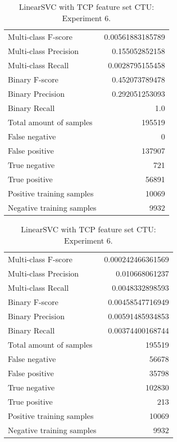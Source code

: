 \begin{table}[H]
\begin{minipage}{0.5\textwidth}
\caption{LinearSVC with TCP feature set CTU: Experiment 5.}
\centering
\begin{tabular}{l r}
\toprule
Multi-class F-score & 0.00561883185789 \\
Multi-class Precision & 0.155052852158 \\
Multi-class Recall & 0.0028795155458 \\
\midrule
Binary F-score & 0.452073789478 \\
Binary Precision & 0.292051253093 \\
Binary Recall & 1.0 \\
\midrule
Total amount of samples & 195519 \\
False negative & 0 \\
False positive & 137907 \\
True negative & 721 \\
True positive & 56891 \\
\midrule
Positive training samples & 10069 \\
Negative training samples & 9932 \\
\bottomrule
\end{tabular}
\end{minipage}
\hfillx
\begin{minipage}{0.5\textwidth}
\caption{LinearSVC with TCP feature set CTU: Experiment 6.}
\centering
\begin{tabular}{l r}
\toprule
Multi-class F-score & 0.000242466361569 \\
Multi-class Precision & 0.010668061237 \\
Multi-class Recall & 0.0048332898593 \\
\midrule
Binary F-score & 0.00458547716949 \\
Binary Precision & 0.00591485934853 \\
Binary Recall & 0.00374400168744 \\
\midrule
Total amount of samples & 195519 \\
False negative & 56678 \\
False positive & 35798 \\
True negative & 102830 \\
True positive & 213 \\
\midrule
Positive training samples & 10069 \\
Negative training samples & 9932 \\
\bottomrule
\end{tabular}
\end{minipage}
\end{table}
